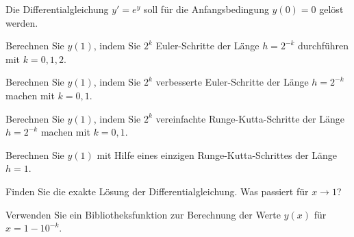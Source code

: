 Die Differentialgleichung $y'=e^y$ soll für die Anfangsbedingung $y(0)=0$
gelöst werden.
\begin{teilaufgaben}
\item
Berechnen Sie $y(1)$, indem Sie $2^k$ Euler-Schritte der Länge $h=2^{-k}$ 
durchführen mit $k=0,1,2$.
\item
Berechnen Sie $y(1)$, indem Sie $2^k$ verbesserte Euler-Schritte der Länge
$h=2^{-k}$ machen mit $k=0,1$.
\item
Berechnen Sie $y(1)$, indem Sie $2^k$ vereinfachte Runge-Kutta-Schritte 
der Länge $h=2^{-k}$ machen mit $k=0,1$.
\item
Berechnen Sie $y(1)$ mit Hilfe eines einzigen Runge-Kutta-Schrittes
der Länge $h=1$.
\item
Finden Sie die exakte Lösung der Differentialgleichung.
Was passiert für $x\to 1$?
\item
Verwenden Sie ein Bibliotheksfunktion zur Berechnung der Werte $y(x)$ für
$x=1-10^{-k}$.
\end{teilaufgaben}

